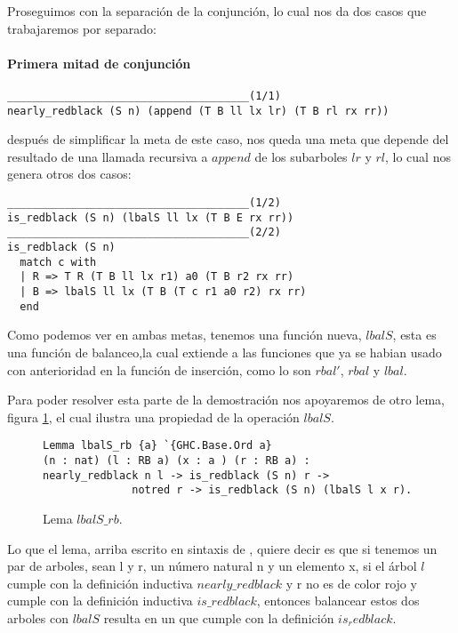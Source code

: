 Proseguimos con la separaci\'on de la conjunci\'on, lo cual nos da dos casos que trabajaremos por
separado:

\paragraph{Primera mitad de conjunci\'on}

\begin{verbatim}
______________________________________(1/1)
nearly_redblack (S n) (append (T B ll lx lr) (T B rl rx rr))
\end{verbatim}

después de simplificar la meta de este caso, nos queda una meta que depende del resultado de una
llamada recursiva a $append$ de los subarboles $lr$ y $rl$, lo cual nos genera otros dos casos:

\begin{verbatim}
______________________________________(1/2)
is_redblack (S n) (lbalS ll lx (T B E rx rr))
______________________________________(2/2)
is_redblack (S n)
  match c with
  | R => T R (T B ll lx r1) a0 (T B r2 rx rr)
  | B => lbalS ll lx (T B (T c r1 a0 r2) rx rr)
  end
\end{verbatim}

Como podemos ver en ambas metas, tenemos una funci\'on nueva, $lbalS$, esta es una funci\'on de
balanceo,la cual extiende a las funciones que ya se habian usado con anterioridad en la funci\'on
de inserci\'on, como lo son $rbal'$, $rbal$ y $lbal$.

Para poder resolver esta parte de la demostraci\'on nos apoyaremos de otro lema, figura
\ref{lema_5}, el cual ilustra una propiedad de la operaci\'on $lbalS$.

\begin{figure}[!ht]
\centering
\captionsetup{justification=centering}
\begin{verbatim}
Lemma lbalS_rb {a} `{GHC.Base.Ord a}
(n : nat) (l : RB a) (x : a ) (r : RB a) :
nearly_redblack n l -> is_redblack (S n) r ->
              notred r -> is_redblack (S n) (lbalS l x r).
\end{verbatim}
\caption{Lema $lbalS\_rb$.}
\label{lema_5}
\end{figure}


Lo que el lema, arriba escrito en sintaxis de {\coq}, quiere decir es que si tenemos un par de
arboles, sean l y r, un n\'umero natural n y un elemento x, si el \'arbol $l$ cumple con la
definici\'on inductiva $nearly\_redblack$ y r no es de color rojo y cumple con la definici\'on
inductiva $is\_redblack$, entonces balancear estos dos arboles con $lbalS$ resulta en un {\arn}
que cumple con la definici\'on $is_redblack$.

